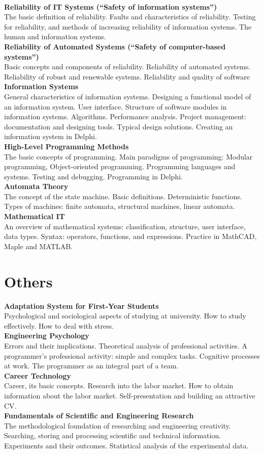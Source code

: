 \documentclass[a4paper, 12pt]{article}
\newcommand{\group}[1] {\section{#1}}
\newcommand{\discipline}[1] {\textbf{#1} \\ }
\newcommand{\desc}[1] { #1 \\ }
\begin{document}
\

\discipline{Reliability of IT Systems (``Safety of information systems'')}
\desc{The basic definition of reliability. Faults and characteristics of reliability. Testing for reliability, and methods of increasing reliability of information systems. The human and information systems.}

\discipline{Reliability of Automated Systems (``Safety of computer-based systems'')}
\desc{Basic concepts and components of reliability. Reliability of automated systems. Reliability of robust  and renewable systems. Reliability and quality of software}

\discipline{Information Systems}
\desc{General characteristics of information systems. Designing a functional model of an information system. User interface. Structure of software modules in information systems. Algorithms. Performance analysis. Project management: documentation and designing tools. Typical design solutions. Creating an information system in Delphi.}

\discipline{High-Level Programming Methods}
\desc{The basic concepts of programming. Main paradigms of programming: Modular programming, Object-oriented programming. Programming languages and systems. Testing and debugging. Programming in Delphi.}

\discipline{Automata Theory}
\desc{The concept of the state machine. Basic definitions. Deterministic functions. Types of machines: finite automata, structural machines, linear automata.}

\discipline{Mathematical IT}
\desc{An overview of mathematical systems: classification, structure, user interface, data types. Syntax: operators, functions, and expressions. Practice in MathCAD, Maple and MATLAB.}


\group{Others}

\discipline{Adaptation System for First-Year Students}
\desc{Psychological and sociological aspects of studying at university. How to study effectively. How to deal with stress.}

\discipline{Engineering Psychology}
\desc{Errors and their implications. Theoretical analysis of professional activities. A programmer's professional activity: simple and complex tasks. Cognitive processes at work. The programmer as an integral part of a team.}

\discipline{Career Technology}
\desc{Career, its basic concepts. Research into the labor market. How to obtain information about the labor market. Self-presentation and building an attractive CV.}

\discipline{Fundamentals of Scientific and Engineering Research}
\desc{The methodological foundation of researching and engineering creativity. Searching, storing and processing scientific and technical information. Experiments and their outcomes. Statistical analysis of the experimental data.}
\end{document}
